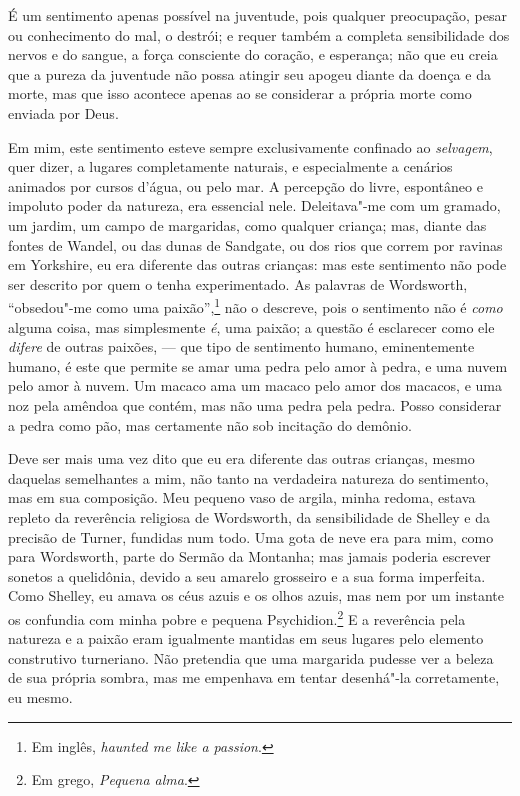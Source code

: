 É um sentimento apenas possível na juventude, pois qualquer preocupação,
pesar ou conhecimento do mal, o destrói; e requer também a completa
sensibilidade dos nervos e do sangue, a força consciente do coração, e
esperança; não que eu creia que a pureza da juventude não possa atingir
seu apogeu diante da doença e da morte, mas que isso acontece apenas ao
se considerar a própria morte como enviada por Deus.

Em mim, este sentimento esteve sempre exclusivamente confinado ao
\textit{selvagem}, quer dizer, a lugares completamente naturais, e
especialmente a cenários animados por cursos d'água, ou pelo mar. A
percepção do livre, espontâneo e impoluto poder da natureza, era
essencial nele. Deleitava"-me com um gramado, um jardim, um campo de
margaridas, como qualquer criança; mas, diante das fontes de Wandel, ou
das dunas de Sandgate, ou dos rios que correm por ravinas em Yorkshire,
eu era diferente das outras crianças: mas este sentimento não pode ser
descrito por quem o tenha experimentado. As palavras de Wordsworth,
``obsedou"-me como uma paixão'',\footnote{Em inglês, \textit{haunted me like
  a passion}.} não o descreve, pois o sentimento não
é \textit{como} alguma coisa, mas simplesmente \textit{é}, uma paixão; a
questão é esclarecer como ele \textit{difere} de outras paixões, --- que
tipo de sentimento humano, eminentemente humano, é este que permite se
amar uma pedra pelo amor à pedra, e uma nuvem pelo amor à nuvem. Um
macaco ama um macaco pelo amor dos macacos, e uma noz pela amêndoa que
contém, mas não uma pedra pela pedra. Posso considerar a pedra como pão,
mas certamente não sob incitação do demônio.

Deve ser mais uma vez dito que eu era diferente das outras crianças,
mesmo daquelas semelhantes a mim, não tanto na verdadeira natureza do
sentimento, mas em sua composição. Meu pequeno vaso de argila, minha
redoma, estava repleto da reverência religiosa de Wordsworth, da
sensibilidade de Shelley e da precisão de Turner, fundidas num todo. Uma
gota de neve era para mim, como para Wordsworth, parte do Sermão da
Montanha; mas jamais poderia escrever sonetos a quelidônia, devido a seu
amarelo grosseiro e a sua forma imperfeita. Como Shelley, eu amava os
céus azuis e os olhos azuis, mas nem por um instante os confundia com
minha pobre e pequena Psychidion.\footnote{Em grego, \textit{Pequena alma}.} E a reverência pela natureza e a paixão eram
igualmente mantidas em seus lugares pelo elemento construtivo
turneriano. Não pretendia que uma margarida pudesse ver a beleza de sua
própria sombra, mas me empenhava em tentar desenhá"-la corretamente, eu
mesmo.

